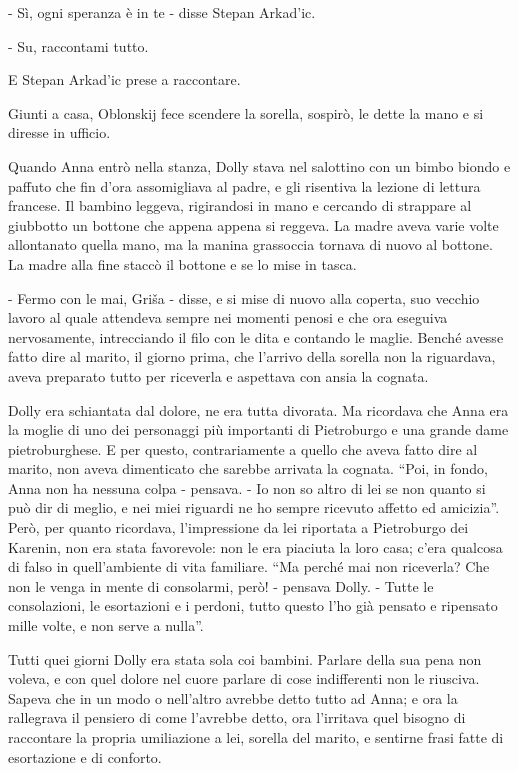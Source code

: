 - Sì, ogni speranza è in te - disse Stepan Arkad'ic. 

- Su, raccontami tutto. 

E Stepan Arkad'ic prese a raccontare. 

Giunti a casa, Oblonskij fece scendere la sorella, sospirò, le dette la mano e si diresse in ufficio. 

Quando Anna entrò nella stanza, Dolly stava nel salottino con un bimbo biondo e paffuto che fin d'ora assomigliava al padre, e gli risentiva la lezione di lettura francese. Il bambino leggeva, rigirandosi in mano e cercando di strappare al giubbotto un bottone che appena appena si reggeva. La madre aveva varie volte allontanato quella mano, ma la manina grassoccia tornava di nuovo al bottone. La madre alla fine staccò il bottone e se lo mise in tasca. 

- Fermo con le mai, Griša - disse, e si mise di nuovo alla coperta, suo vecchio lavoro al quale attendeva sempre nei momenti penosi e che ora eseguiva nervosamente, intrecciando il filo con le dita e contando le maglie. Benché avesse fatto dire al marito, il giorno prima, che l'arrivo della sorella non la riguardava, aveva preparato tutto per riceverla e aspettava con ansia la cognata. 

Dolly era schiantata dal dolore, ne era tutta divorata. Ma ricordava che Anna era la moglie di uno dei personaggi più importanti di Pietroburgo e una grande dame pietroburghese. E per questo, contrariamente a quello che aveva fatto dire al marito, non aveva dimenticato che sarebbe arrivata la cognata. ``Poi, in fondo, Anna non ha nessuna colpa - pensava. - Io non so altro di lei se non quanto si può dir di meglio, e nei miei riguardi ne ho sempre ricevuto affetto ed amicizia''. Però, per quanto ricordava, l'impressione da lei riportata a Pietroburgo dei Karenin, non era stata favorevole: non le era piaciuta la loro casa; c'era qualcosa di falso in quell'ambiente di vita familiare. ``Ma perché mai non riceverla? Che non le venga in mente di consolarmi, però! - pensava Dolly. - Tutte le consolazioni, le esortazioni e i perdoni, tutto questo l'ho già pensato e ripensato mille volte, e non serve a nulla''. 

Tutti quei giorni Dolly era stata sola coi bambini. Parlare della sua pena non voleva, e con quel dolore nel cuore parlare di cose indifferenti non le riusciva. Sapeva che in un modo o nell'altro avrebbe detto tutto ad Anna; e ora la rallegrava il pensiero di come l'avrebbe detto, ora l'irritava quel bisogno di raccontare la propria umiliazione a lei, sorella del marito, e sentirne frasi fatte di esortazione e di conforto. 

